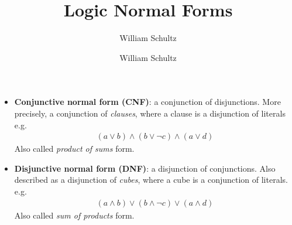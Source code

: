 \documentclass[10pt,a4paper]{article}
\author{William Schultz}
\begin{document}
\title{Logic Normal Forms}
\author{William Schultz}
\maketitle

\begin{itemize}
    \item \textbf{Conjunctive normal form (CNF)}: a conjunction of disjunctions. More precisely, a conjunction of \textit{clauses}, where a clause is a disjunction of literals e.g.
    \begin{align*}
        (a \vee b) \wedge (b \vee \neg c) \wedge (a \vee d)
    \end{align*}
    Also called \textit{product of sums} form.
    \item \textbf{Disjunctive normal form (DNF)}: a disjunction of conjunctions. Also described as a disjunction of \textit{cubes}, where a cube is a conjunction of literals. e.g.
    \begin{align*}
        (a \wedge b) \vee (b \wedge \neg c) \vee (a \wedge d)
    \end{align*}
    Also called \textit{sum of products} form.
\end{itemize}
\end{document}
